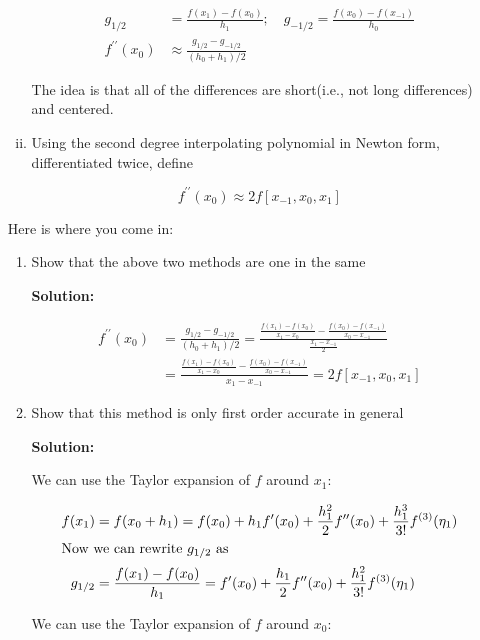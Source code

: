 \documentclass[12pt]{article}
\newcommand{\pprime}{\prime \prime}
\begin{document}
\begin{enumerate}
\begin{enumerate}[i.]
\begin{align*}
g_{1/2} &= \frac{f(x_{1}) - f(x_{0})}{h_{1}};\quad g_{-1/2} = \frac{f(x_{0}) - f(x_{-1})}{h_{0}}\\
f^{\prime \prime}(x_{0}) &\approx \frac{g_{1/2} - g_{-1/2}}{(h_{0} + h_{1})/2}
\end{align*}

The idea is that all of the differences are short(i.e., not long differences) and centered.

\item Using the second degree interpolating polynomial in Newton form, differentiated twice, define

\[
f^{\prime \prime}(x_{0}) \approx 2f[x_{-1}, x_{0}, x_{1}]
\]

\end{enumerate}

Here is where you come in:

\begin{enumerate}
\item Show that the above two methods are one in the same

{\bf Solution:}

\begin{align*}
f^{\pprime}(x_{0}) &= \frac{g_{1/2} - g_{-1/2}}{(h_{0} + h_{1})/2} = \frac{\frac{f(x_{1}) - f(x_{0})}{x_{1} - x_{0}} - \frac{f(x_{0}) - f(x_{-1})}{x_{0} - x_{-1}}}{\frac{x_{1} - x_{-1}}{2}}\\
&= \frac{\frac{f(x_{1}) - f(x_{0})}{x_{1} - x_{0}} - \frac{f(x_{0}) - f(x_{-1})}{x_{0} - x_{-1}}}{x_{1} - x_{-1}} = 2f[x_{-1}, x_{0}, x_{1}]
\end{align*}

\item Show that this method is only first order accurate in general

{\bf Solution:}

We can use the Taylor expansion of $f$ around $x_{1}$:

\begin{align*}
f(x_{1}) &= f(x_{0} + h_{1}) = f(x_{0}) + h_{1}f^{\prime}(x_{0}) + \frac{h_{1}^{2}}{2}f^{\pprime}(x_{0}) + \frac{h_{1}^{3}}{3!}f^{(3)}(\eta_{1})\\
\intertext{Now we can rewrite $g_{1/2}$ as}
g_{1/2} &= \frac{f(x_{1}) - f(x_{0})}{h_{1}} = f^{\prime}(x_{0}) + \frac{h_{1}}{2}f^{\pprime}(x_{0}) + \frac{h_{1}^{2}}{3!}f^{(3)}(\eta_{1})
\end{align*}

We can use the Taylor expansion of $f$ around $x_{0}$:


\end{enumerate}
\end{enumerate}
\end{document}

